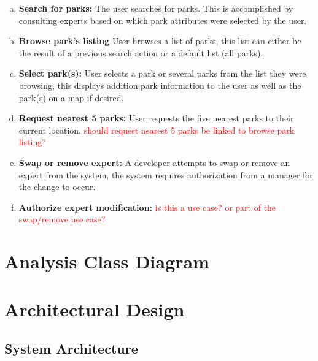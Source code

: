 \documentclass[titlepage]{article}
\begin{document}
\begin{enumerate}[a)]
    \item \textbf{Search for parks:} The user searches for parks. This is accomplished by consulting experts based on which park attributes were selected by the user.
    \item \textbf{Browse park's listing} User browses a list of parks, this list can either be the result of a previous search action or a default list (all parks).
    \item \textbf{Select park(s):} User selects a park or several parks from the list they were browsing, this displays addition park information to the user as well as the park(s) on a map if desired.
    \item \textbf{Request nearest 5 parks:} User requests the five nearest parks to their current location. \textcolor{red}{should request nearest 5 parks be linked to browse park listing?}
    \item \textbf{Swap or remove expert:} A developer attempts to swap or remove an expert from the system, the system requires authorization from a manager for the change to occur.
    \item \textbf{Authorize expert modification:} \textcolor{red}{is this a use case? or part of the swap/remove use case?}
\end{enumerate}


\section{Analysis Class Diagram}
\label{sec:analysis_class_diagram}



\section{Architectural Design}
\label{sec:architectural_design}


\subsection{System Architecture}
\label{sub:system_architecture}
\end{document}
